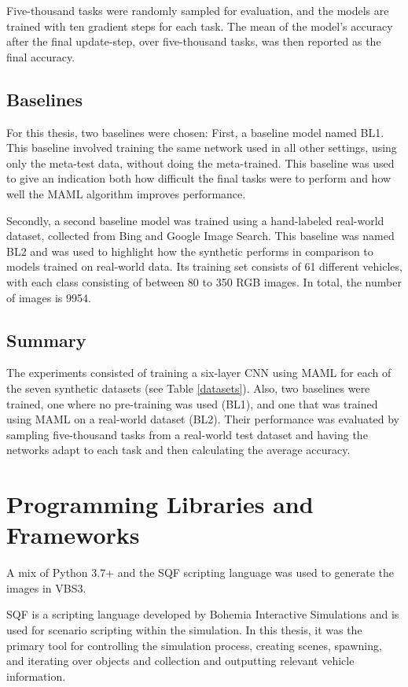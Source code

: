Five-thousand tasks were randomly sampled for evaluation, and the models are trained with ten gradient steps for each task. The mean of the model's accuracy after the final update-step, over five-thousand tasks, was then reported as the final accuracy.

\subsection{Baselines}
For this thesis, two baselines were chosen: First, a baseline model named BL1. This baseline involved training the same network used in all other settings, using only the meta-test data, without doing the meta-trained. This baseline was used to give an indication both how difficult the final tasks were to perform and how well the \gls{MAML} algorithm improves performance.

Secondly, a second baseline model was trained using a hand-labeled real-world dataset, collected from Bing and Google Image Search. This baseline was named BL2 and was used to highlight how the synthetic performs in comparison to models trained on real-world data. Its training set consists of 61 different vehicles, with each class consisting of between 80 to 350 RGB images. In total, the number of images is 9954.


\subsection{Summary}
The experiments consisted of training a six-layer \gls{CNN} using \gls{MAML} for each of the seven synthetic datasets (see Table \ref{datasets}). Also, two baselines were trained, one where no pre-training was used (BL1), and one that was trained using \gls{MAML} on a real-world dataset (BL2). Their performance was evaluated by sampling five-thousand tasks from a real-world test dataset and having the networks adapt to each task and then calculating the average accuracy.

\section{Programming Libraries and Frameworks} \label{software}
A mix of Python 3.7+ and the \gls{SQF} scripting language was used to generate the images in VBS3. 

\gls{SQF} is a scripting language developed by Bohemia Interactive Simulations and is used for scenario scripting within the simulation. In this thesis, it was the primary tool for controlling the simulation process, creating scenes, spawning, and iterating over objects and collection and outputting relevant vehicle information.

